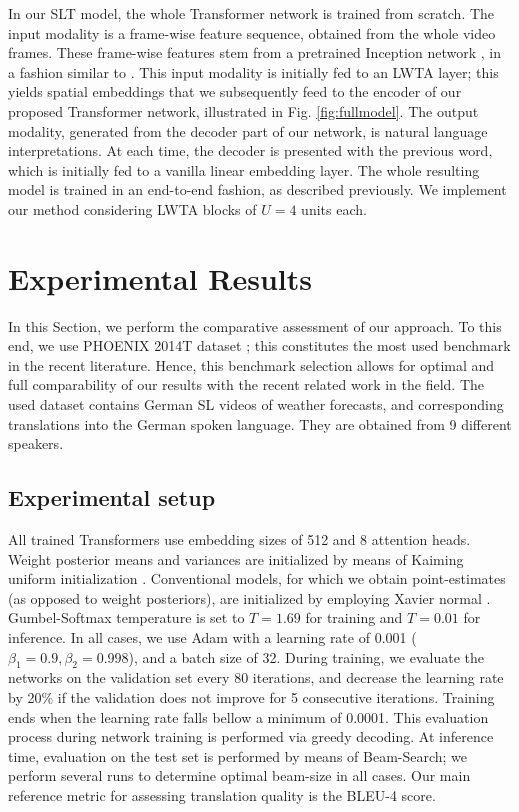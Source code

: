 \documentclass[10pt,twocolumn,letterpaper]{article}
\begin{document}
In our SLT  model, the whole Transformer network is trained from scratch. The input modality is a frame-wise feature sequence, obtained from the whole video frames. These frame-wise features stem from a pretrained Inception network \cite{szegedy2017inception, Koller2020}, in a fashion similar to \cite{Camgoz20}. This input modality is initially fed to an LWTA layer; this yields spatial embeddings that we subsequently feed to the encoder of our proposed Transformer network, illustrated in Fig. \ref{fig:fullmodel}. The output modality, generated from the decoder part of our network, is natural language interpretations. At each time, the decoder is presented with the previous word, which is initially fed to a vanilla linear embedding layer. The whole resulting model is trained in an end-to-end fashion, as described previously. We implement our method considering LWTA blocks of $U=4$ units each.


\section{Experimental Results}
\label{sec:experimental}

In this Section, we perform the comparative assessment of our approach. To this end, we use PHOENIX 2014T dataset \cite{Camgoz18}; this constitutes the most used benchmark in the recent literature. Hence, this benchmark selection allows for optimal and full comparability of our results with the recent related work in the field. The used dataset contains German SL videos of weather forecasts, and corresponding  translations into the German spoken language. They are obtained from 9 different speakers.


\subsection{Experimental setup}


All trained Transformers use embedding sizes of 512 and 8 attention heads. Weight posterior means and variances are initialized by means of Kaiming uniform initialization \cite{he2015delving}. Conventional models, for which we obtain point-estimates (as opposed to weight posteriors), are initialized by employing Xavier normal \cite{glorot2010understanding}. Gumbel-Softmax temperature is set to $T = 1.69$ for training and $T=0.01$ for inference. In all cases, we use Adam \cite{kingma2014adam} with a learning rate of 0.001 ($\beta_{1}=0.9, \beta_{2}=0.998$), and a batch size of 32. During training, we evaluate the networks on the validation set every 80 iterations, and decrease the learning rate by 20\%  if the validation does not improve for 5 consecutive iterations. Training ends when the learning rate falls bellow a minimum of 0.0001. This evaluation process during network training is performed via greedy decoding. At inference time, evaluation on the test set is performed by means of Beam-Search; we perform several runs to determine optimal beam-size in all cases. Our main reference metric for assessing translation quality is the BLEU-4 score. 
\end{document}
